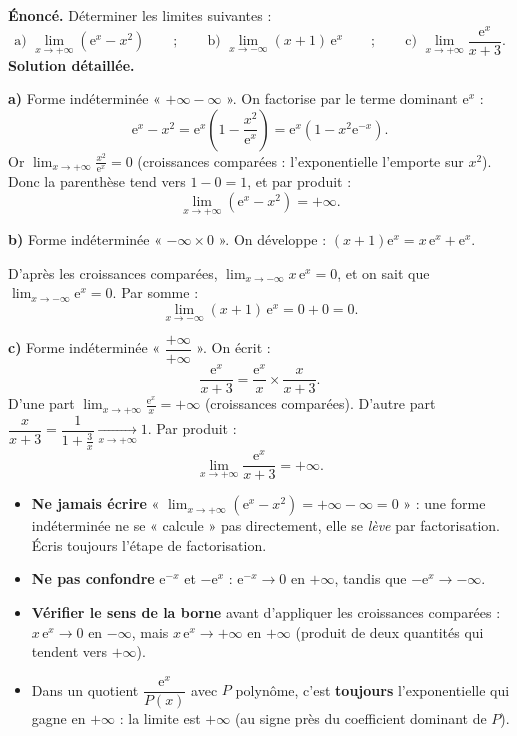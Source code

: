 \documentclass[11pt]{article}
\begin{document}
\begin{exoresolu}
\textbf{Énoncé.} Déterminer les limites suivantes :
\[ \text{a) } \lim_{x \to +\infty} \left( \mathrm{e}^x - x^2 \right) \qquad ; \qquad \text{b) } \lim_{x \to -\infty} (x+1)\,\mathrm{e}^{x} \qquad ; \qquad \text{c) } \lim_{x \to +\infty} \frac{\mathrm{e}^x}{x + 3}. \]
\tcblower
\textbf{Solution détaillée.}

\textbf{a)} Forme indéterminée « $+\infty - \infty$ ». On factorise par le terme dominant $\mathrm{e}^x$ :
\[ \mathrm{e}^x - x^2 = \mathrm{e}^x \left( 1 - \frac{x^2}{\mathrm{e}^x} \right) = \mathrm{e}^x \left( 1 - x^2 \mathrm{e}^{-x} \right). \]
Or $\displaystyle\lim_{x \to +\infty} \frac{x^2}{\mathrm{e}^x} = 0$ (croissances comparées : l'exponentielle l'emporte sur $x^2$). Donc la parenthèse tend vers $1 - 0 = 1$, et par produit :
\[ \lim_{x \to +\infty} \left( \mathrm{e}^x - x^2 \right) = +\infty. \]

\textbf{b)} Forme indéterminée « $-\infty \times 0$ ». On développe : $(x+1)\mathrm{e}^x = x\,\mathrm{e}^x + \mathrm{e}^x$.

D'après les croissances comparées, $\displaystyle\lim_{x \to -\infty} x\,\mathrm{e}^x = 0$, et on sait que $\displaystyle\lim_{x \to -\infty} \mathrm{e}^x = 0$. Par somme :
\[ \lim_{x \to -\infty} (x+1)\,\mathrm{e}^x = 0 + 0 = 0. \]

\textbf{c)} Forme indéterminée « $\dfrac{+\infty}{+\infty}$ ». On écrit :
\[ \frac{\mathrm{e}^x}{x+3} = \frac{\mathrm{e}^x}{x} \times \frac{x}{x+3}. \]
D'une part $\displaystyle\lim_{x \to +\infty} \frac{\mathrm{e}^x}{x} = +\infty$ (croissances comparées). D'autre part $\dfrac{x}{x+3} = \dfrac{1}{1 + \frac{3}{x}} \xrightarrow[x \to +\infty]{} 1$. Par produit :
\[ \lim_{x \to +\infty} \frac{\mathrm{e}^x}{x+3} = +\infty. \]
\end{exoresolu}

\begin{attention}
\begin{itemize}
\item \textbf{Ne jamais écrire} « $\displaystyle\lim_{x \to +\infty}(\mathrm{e}^x - x^2) = +\infty - \infty = 0$ » : une forme indéterminée ne se « calcule » pas directement, elle se \emph{lève} par factorisation. Écris toujours l'étape de factorisation.
\item \textbf{Ne pas confondre} $\mathrm{e}^{-x}$ et $-\mathrm{e}^x$ : $\mathrm{e}^{-x} \to 0$ en $+\infty$, tandis que $-\mathrm{e}^x \to -\infty$.
\item \textbf{Vérifier le sens de la borne} avant d'appliquer les croissances comparées : $x\,\mathrm{e}^x \to 0$ en $-\infty$, mais $x\,\mathrm{e}^x \to +\infty$ en $+\infty$ (produit de deux quantités qui tendent vers $+\infty$).
\item Dans un quotient $\dfrac{\mathrm{e}^x}{P(x)}$ avec $P$ polynôme, c'est \textbf{toujours} l'exponentielle qui gagne en $+\infty$ : la limite est $+\infty$ (au signe près du coefficient dominant de $P$).
\end{itemize}
\end{attention}
\end{document}
